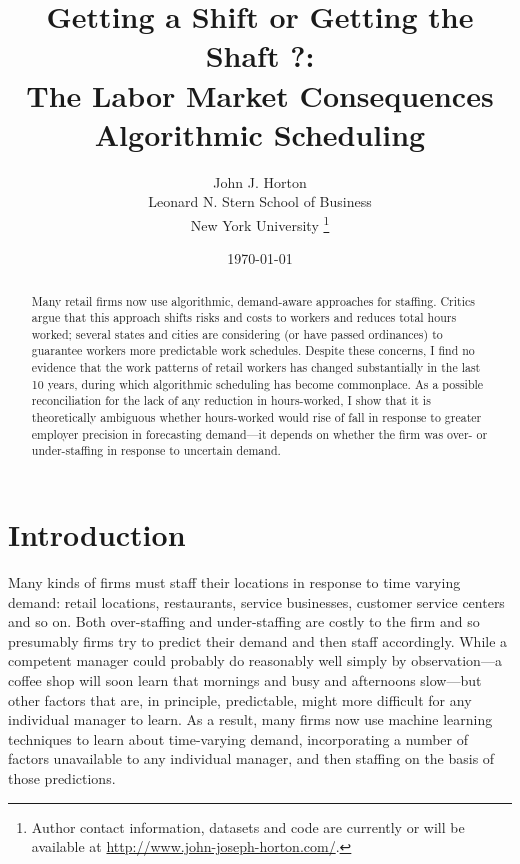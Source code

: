 \documentclass[11pt]{article}
\begin{document}
 

\title{Getting a Shift or Getting the Shaft ?: \\
  The Labor Market Consequences Algorithmic Scheduling}

\date{\today}

\author{John J. Horton \\
  Leonard N. Stern School of Business\\
  New York University \footnote{Author contact information, datasets and code are currently or will be available at \href{http://www.john-joseph-horton.com/}{http://www.john-joseph-horton.com/}. } }
\maketitle

\begin{abstract}
  \noindent
  Many retail firms now use algorithmic, demand-aware approaches for staffing.
  Critics argue that this approach shifts risks and costs to workers and reduces total hours worked;
  several states and cities are considering (or have passed ordinances) to guarantee workers more predictable work schedules.
  Despite these concerns, I find no evidence that the work patterns of retail workers has changed substantially in the last 10 years, during which algorithmic scheduling has become commonplace. 
  As a possible reconciliation for the lack of any reduction in hours-worked, I show that it is theoretically ambiguous whether hours-worked would rise of fall in response to greater employer precision in forecasting demand---it depends on whether the firm was over- or under-staffing in response to uncertain demand. 
\end{abstract} 

\section{Introduction}

Many kinds of firms must staff their locations in response to time varying demand:
retail locations, restaurants, service businesses, customer service centers and so on. 
Both over-staffing and under-staffing are costly to the firm and so presumably firms try to predict their demand and then staff accordingly.
While a competent manager could probably do reasonably well simply by observation---a coffee shop will soon learn that mornings and busy and afternoons slow---but other factors that are, in principle, predictable, might more difficult for any individual manager to learn.
As a result, many firms now use machine learning techniques to learn about time-varying demand, incorporating a number of factors unavailable to any individual manager, and then staffing on the basis of those predictions. 
\end{document}
